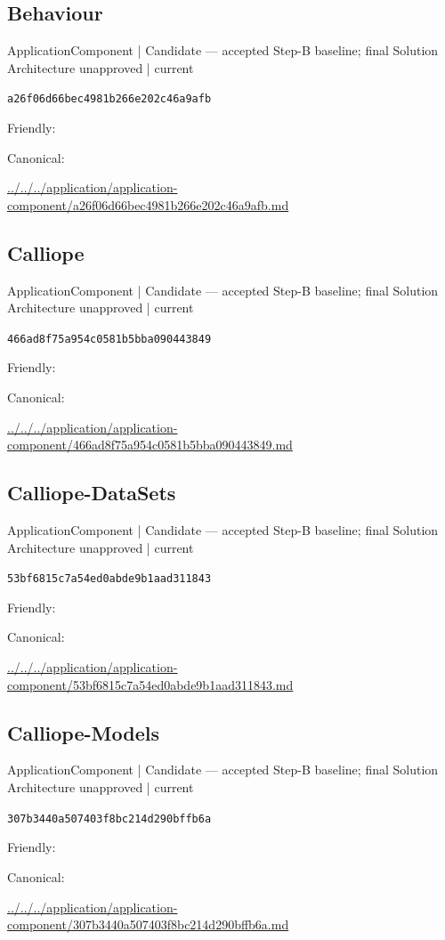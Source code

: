 \documentclass[10pt,a4paper]{article}
\begin{document}
\subsection*{Behaviour}
{\small ApplicationComponent | Candidate — accepted Step-B baseline; final Solution Architecture unapproved | current}\par
\texttt{a26f06d66bec4981b266e202c46a9afb}\par
Friendly: \par
Canonical: \par
{\footnotesize\url{../../../application/application-component/a26f06d66bec4981b266e202c46a9afb.md}}\par
\subsection*{Calliope}
{\small ApplicationComponent | Candidate — accepted Step-B baseline; final Solution Architecture unapproved | current}\par
\texttt{466ad8f75a954c0581b5bba090443849}\par
Friendly: \par
Canonical: \par
{\footnotesize\url{../../../application/application-component/466ad8f75a954c0581b5bba090443849.md}}\par
\subsection*{Calliope-DataSets}
{\small ApplicationComponent | Candidate — accepted Step-B baseline; final Solution Architecture unapproved | current}\par
\texttt{53bf6815c7a54ed0abde9b1aad311843}\par
Friendly: \par
Canonical: \par
{\footnotesize\url{../../../application/application-component/53bf6815c7a54ed0abde9b1aad311843.md}}\par
\subsection*{Calliope-Models}
{\small ApplicationComponent | Candidate — accepted Step-B baseline; final Solution Architecture unapproved | current}\par
\texttt{307b3440a507403f8bc214d290bffb6a}\par
Friendly: \par
Canonical: \par
{\footnotesize\url{../../../application/application-component/307b3440a507403f8bc214d290bffb6a.md}}\par
\end{document}
